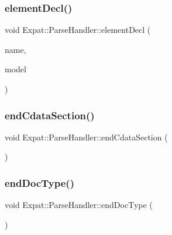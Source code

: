\hypertarget{class_expat_1_1_parse_handler_a671fa663133a106e4f9f7c0496ddef5a}{}\label{class_expat_1_1_parse_handler_a671fa663133a106e4f9f7c0496ddef5a} 
\subsubsection{\texorpdfstring{element\+Decl()}{elementDecl()}}
{\footnotesize\ttfamily void Expat\+::\+Parse\+Handler\+::element\+Decl (\begin{DoxyParamCaption}\item[{const X\+M\+L\+\_\+\+Char $\ast$}]{name,  }\item[{X\+M\+L\+\_\+\+Content $\ast$}]{model }\end{DoxyParamCaption})\hspace{0.3cm}{\ttfamily [virtual]}}

\hypertarget{class_expat_1_1_parse_handler_a63611532e55e95c43d074846fdc73314}{}\label{class_expat_1_1_parse_handler_a63611532e55e95c43d074846fdc73314} 
\subsubsection{\texorpdfstring{end\+Cdata\+Section()}{endCdataSection()}}
{\footnotesize\ttfamily void Expat\+::\+Parse\+Handler\+::end\+Cdata\+Section (\begin{DoxyParamCaption}{ }\end{DoxyParamCaption})\hspace{0.3cm}{\ttfamily [virtual]}}

\hypertarget{class_expat_1_1_parse_handler_ad0d1f858b37474da0f634c2d60d94da6}{}\label{class_expat_1_1_parse_handler_ad0d1f858b37474da0f634c2d60d94da6} 
\subsubsection{\texorpdfstring{end\+Doc\+Type()}{endDocType()}}
{\footnotesize\ttfamily void Expat\+::\+Parse\+Handler\+::end\+Doc\+Type (\begin{DoxyParamCaption}{ }\end{DoxyParamCaption})\hspace{0.3cm}{\ttfamily [virtual]}}

